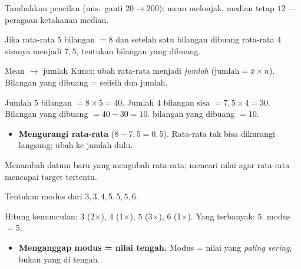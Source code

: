 \begin{variasi}
Tambahkan pencilan (mis.\ ganti $20\to200$): mean melonjak, median tetap $12$
--- peragaan ketahanan median.
\end{variasi}

\begin{soalbox}{}
Jika rata-rata $5$ bilangan $=8$ dan setelah satu bilangan dibuang rata-rata $4$
sisanya menjadi $7{,}5$, tentukan bilangan yang dibuang.
\end{soalbox}

\begin{ingat}{Mean $\to$ jumlah}
Kunci: ubah rata-rata menjadi \emph{jumlah} ($\text{jumlah}=\bar x\times n$).
Bilangan yang dibuang = selisih dua jumlah.
\end{ingat}

\jawab
{} Jumlah $5$ bilangan $=8\times5=40$.
 Jumlah $4$ bilangan sisa $=7{,}5\times4=30$.
 Bilangan yang dibuang $=40-30=10$.
\jadi bilangan yang dibuang $=10$.

\begin{jebakan}
\begin{itemize}[leftmargin=*,topsep=2pt]
  \item \textbf{Mengurangi rata-rata} ($8-7{,}5=0{,}5$). Rata-rata tak bisa
  dikurangi langsung; ubah ke jumlah dulu.
\end{itemize}
\end{jebakan}

\begin{variasi}
Menambah datum baru yang mengubah rata-rata; mencari nilai agar rata-rata
mencapai target tertentu.
\end{variasi}

\begin{soalbox}{}
Tentukan modus dari $3,3,4,5,5,5,6$.
\end{soalbox}

\jawab
{} Hitung kemunculan: $3$ (2$\times$), $4$ (1$\times$), $5$ (3$\times$),
$6$ (1$\times$).
 Yang terbanyak: $5$.
\jadi modus $=5$.

\begin{jebakan}
\begin{itemize}[leftmargin=*,topsep=2pt]
  \item \textbf{Menganggap modus = nilai tengah.} Modus = nilai yang \emph{paling
  sering}, bukan yang di tengah.
\end{itemize}
\end{jebakan}

